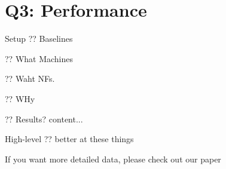 \documentclass[aspectratio=169,xcolor={dvipsnames}
,handout
]{beamer}
\begin{document}
\section{Q3: Performance}

\begin{frame}{Setup}
	?? Baselines
	
	?? What Machines
	
	?? Waht NFs.
	
	?? WHy
\end{frame}

\begin{frame}{?? Results?}
	content...
\end{frame}

\begin{frame}{High-level}
	?? better at these things
	
	If you want more detailed data, please check out our paper
\end{frame}

\end{document}
